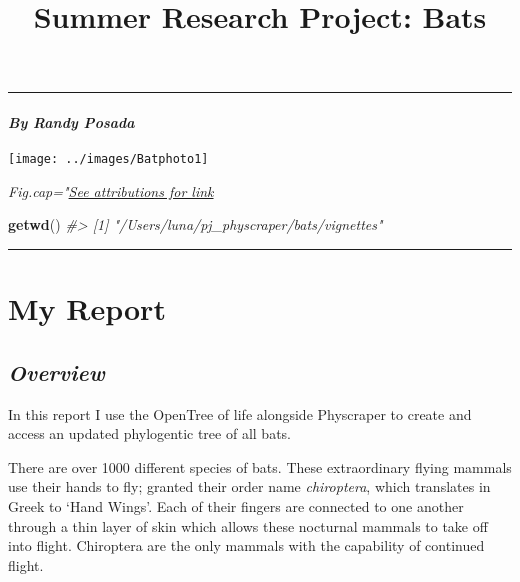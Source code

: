 \documentclass[]{article}
\title{Summer Research Project: Bats}
\author{}
\date{\vspace{-2.5em}}
\newenvironment{Shaded}{\begin{snugshade}}{\end{snugshade}}
\newcommand{\CommentTok}[1]{\textcolor[rgb]{0.56,0.35,0.01}{\textit{#1}}}
\newcommand{\KeywordTok}[1]{\textcolor[rgb]{0.13,0.29,0.53}{\textbf{#1}}}
\newcommand{\NormalTok}[1]{#1}
\let\oldparagraph\paragraph
\renewcommand{\paragraph}[1]{\oldparagraph{#1}\mbox{}}
\begin{document}
\maketitle

\begin{center}\rule{0.5\linewidth}{0.5pt}\end{center}

\hypertarget{by-randy-posada}{%
\paragraph{\texorpdfstring{\emph{By Randy
Posada}}{By Randy Posada}}\label{by-randy-posada}}

\begin{center}\texttt{[image: ../images/Batphoto1]} \end{center}

\emph{Fig.cap="\protect\hyperlink{Attributions}{See attributions for
link}}

\begin{Shaded}
\begin{Highlighting}[]
\KeywordTok{getwd}\NormalTok{()}
\CommentTok{#> [1] "/Users/luna/pj_physcraper/bats/vignettes"}
\end{Highlighting}
\end{Shaded}

\begin{center}\rule{0.5\linewidth}{0.5pt}\end{center}

\hypertarget{my-report}{%
\section{\texorpdfstring{\textbf{My
Report}}{My Report}}\label{my-report}}

\hypertarget{overview}{%
\subsection{\texorpdfstring{\emph{Overview}}{Overview}}\label{overview}}

In this report I use the OpenTree of life alongside Physcraper to create
and access an updated phylogentic tree of all bats.

There are over 1000 different species of bats. These extraordinary
flying mammals use their hands to fly; granted their order name
\emph{chiroptera}, which translates in Greek to `Hand Wings'. Each of
their fingers are connected to one another through a thin layer of skin
which allows these nocturnal mammals to take off into flight. Chiroptera
are the only mammals with the capability of continued flight.
\end{document}
